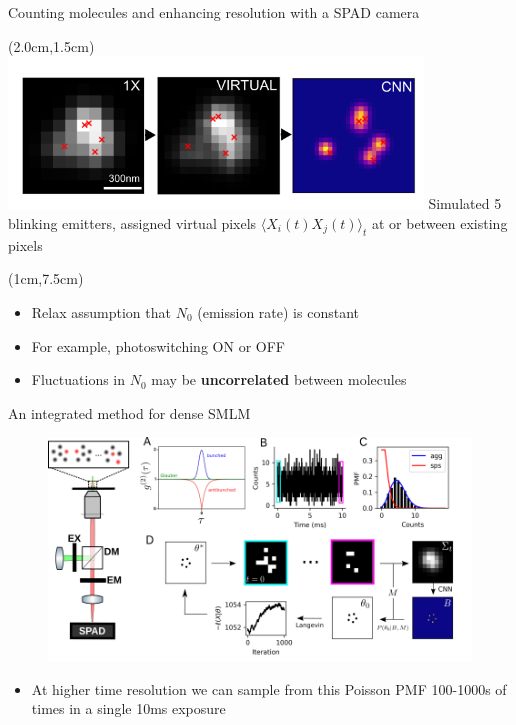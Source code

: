 \documentclass{beamer}					%
\begin{document}
\begin{frame}{Counting molecules and enhancing resolution with a SPAD camera}

\begin{textblock*}{11cm}(2.0cm,1.5cm)
\includegraphics[width=11cm]{Doubled-cNN.png}
Simulated 5 blinking emitters, assigned virtual pixels $\langle X_{i}(t)X_{j}(t) \rangle_{t}$ at or between existing pixels
\end{textblock*}

\begin{textblock*}{11cm}(1cm,7.5cm)
\begin{itemize}
\item Relax assumption that $N_{0}$ (emission rate) is constant 
\item For example, photoswitching \textrm{ON} or \textrm{OFF}
\item Fluctuations in $N_{0}$ may be \textbf{uncorrelated} between molecules
\end{itemize}

\end{textblock*}

\end{frame}

\begin{frame}{An integrated method for dense SMLM}
\begin{figure}
\includegraphics[width=\textwidth]{SPAD.png}
\end{figure}
\begin{itemize}
\item At higher time resolution we can sample from this Poisson PMF 100-1000s of times in a single 10ms exposure
\end{itemize}
\end{frame}
\end{document}
